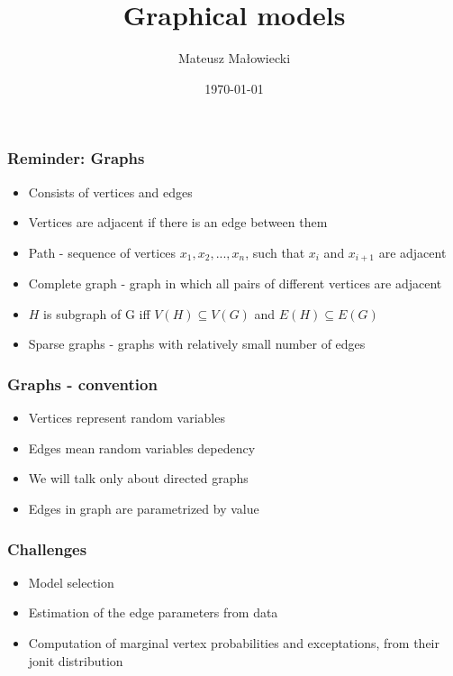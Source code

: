 \documentclass{beamer}
\title{Graphical models}
\author{Mateusz Małowiecki}
\institute[Instytut Informatyki Uniwersytetu Wrocławskiego]{}
\date{\today}
\begin{document}
\begin{frame}
  \titlepage
\end{frame}
\begin{frame}
  \frametitle{Reminder: Graphs}
    \begin{itemize}
      \item Consists of vertices and edges
      \item Vertices are adjacent if there is an edge between them
      \item Path - sequence of vertices $x_1, x_2, ..., x_n$, such that $x_i$ and $x_{i+1}$ are adjacent 
      \item Complete graph - graph in which all pairs of different vertices are adjacent 
      \item $H$ is subgraph of G iff $V(H) \subseteq V(G)$ and $E(H) \subseteq E(G)$  
      \item Sparse graphs - graphs with relatively small number of edges
    \end{itemize}
\end{frame}
\begin{frame}
  \frametitle{Graphs - convention}
  \begin{itemize}
      \item Vertices represent random variables
      \item Edges mean random variables depedency
      \item We will talk only about directed graphs
      \item Edges in graph are parametrized by value
  \end{itemize}
\end{frame}
\begin{frame}
\frametitle{Challenges}
  \begin{itemize}
      \item Model selection
      \item Estimation of the edge parameters from data
      \item Computation of marginal vertex probabilities and exceptations, from their jonit distribution
  \end{itemize}
\end{frame}
\end{document}
